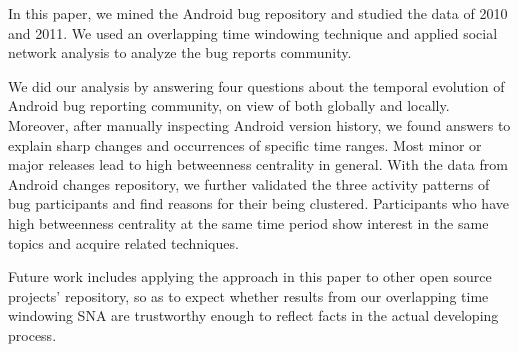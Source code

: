 \documentclass[10pt, conference, compsocconf]{IEEEtran}
\begin{document}
In this paper, we mined the Android bug repository and studied the
data of 2010 and 2011. We used an overlapping time windowing technique
and applied social network analysis to analyze the bug reports
community. 


We did our analysis by answering four questions about the temporal
evolution of Android bug reporting community, on view of both globally
and locally. Moreover, after manually inspecting Android version
history, we found answers to explain sharp changes and occurrences of
specific time ranges. Most minor or major releases lead to high
betweenness centrality in general. With the data from Android changes
repository, we further validated the three activity patterns of bug
participants and find reasons for their being clustered. Participants
who have high betweenness centrality at the same time period show
interest in the same topics and acquire related techniques.


Future work includes applying the approach in this paper to other open
source projects' repository, so as to expect whether results from our
overlapping time windowing SNA are trustworthy enough to reflect facts
in the actual developing process. 











\balance

\end{document}

